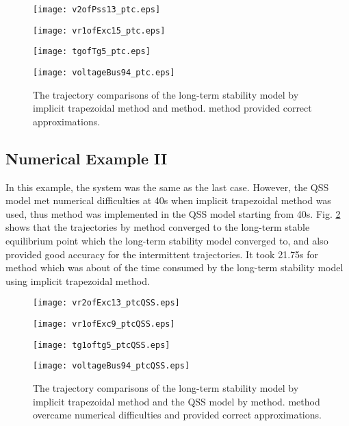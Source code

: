 \documentclass[journal]{IEEEtran}
\begin{document}
\begin{figure}[!ht]
\centering
\begin{minipage}[t]{0.5\linewidth}
\texttt{[image: v2ofPss13\_ptc.eps]}
\end{minipage}\begin{minipage}[t]{0.5\linewidth}
\texttt{[image: vr1ofExc15\_ptc.eps]}
\end{minipage}
\begin{minipage}[t]{0.5\linewidth}
\texttt{[image: tgofTg5\_ptc.eps]}
\end{minipage}\begin{minipage}[t]{0.5\linewidth}
\texttt{[image: voltageBus94\_ptc.eps]}
\end{minipage}
\caption{The trajectory comparisons of the long-term stability model by implicit trapezoidal method and  method.  method provided correct approximations.}\label{TDSPTC}
\end{figure}

\subsection{Numerical Example II}
In this example, the system was the same as the last case. However, the QSS model met numerical difficulties at 40s when implicit trapezoidal method was used, thus  method was implemented in the QSS model starting from 40s. Fig. \ref{TDSPTCQSS} shows that the trajectories by  method converged to the long-term stable equilibrium point which the long-term stability model converged to, and also provided good accuracy for the intermittent trajectories. It took 21.75s for  method which  was about  of the time consumed by the long-term stability model using implicit trapezoidal method.


\begin{figure}[!ht]
\centering
\begin{minipage}[t]{0.5\linewidth}
\texttt{[image: vr2ofExc13\_ptcQSS.eps]}
\end{minipage}\begin{minipage}[t]{0.5\linewidth}
\texttt{[image: vr1ofExc9\_ptcQSS.eps]}
\end{minipage}
\begin{minipage}[t]{0.5\linewidth}
\texttt{[image: tg1oftg5\_ptcQSS.eps]}
\end{minipage}\begin{minipage}[t]{0.5\linewidth}
\texttt{[image: voltageBus94\_ptcQSS.eps]}
\end{minipage}
\caption{The trajectory comparisons of the long-term stability model by implicit trapezoidal method and the QSS model by  method.  method overcame numerical difficulties and provided correct approximations.}\label{TDSPTCQSS}
\end{figure}
\end{document}
